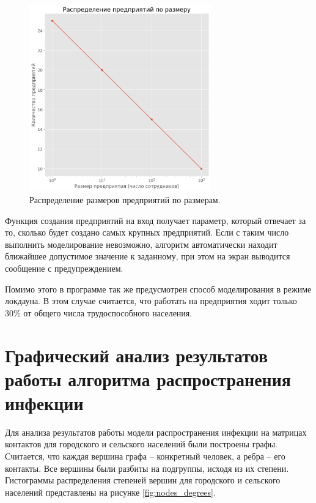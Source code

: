\documentclass[14pt,a4paper]{article}
\begin{document}
\begin{figure}[h!]
	\centering
	\includegraphics[width=0.7\textwidth]{img/manufactoris_distribution.png}
	\caption{Распределение размеров предприятий по размерам.}
	\label{fig:manufactories_linear}
\end{figure}

Функция создания предприятий на вход получает параметр, который отвечает за то, сколько будет создано самых крупных предприятий. Если с таким число выполнить моделирование невозможно, алгоритм автоматически находит ближайшее допустимое значение к заданному, при этом на экран выводится сообщение с предупреждением.

Помимо этого в программе так же предусмотрен способ моделирования в режиме локдауна. В этом случае считается, что работать на предприятия ходит только 30\% от общего числа трудоспособного населения.

\newpage

\section{Графический анализ результатов работы алгоритма распространения инфекции}

Для анализа результатов работы модели распространения инфекции на матрицах контактов для городского и сельского населений были построены графы. Считается, что каждая вершина графа -- конкретный человек, а ребра -- его контакты. Все вершины были разбиты на подгруппы, исходя из их степени. Гистограммы распределения степеней вершин для городского и сельского населений представлены на рисунке \ref{fig:nodes_degrees}.
\end{document}
